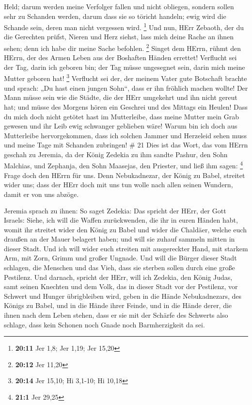 Held; darum werden meine Verfolger fallen und nicht obliegen, sondern
sollen sehr zu Schanden werden, darum dass sie so töricht handeln; ewig
wird die Schande sein, deren man nicht vergessen wird. \footnote{\textbf{20:11}
  Jer 1,8; Jer 1,19; Jer 15,20}  Und nun, HErr Zebaoth, der
du die Gerechten prüfst, Nieren und Herz siehst, lass mich deine Rache
an ihnen sehen; denn ich habe dir meine Sache befohlen. \footnote{\textbf{20:12}
  Jer 11,20}  Singet dem HErrn, rühmt den HErrn, der des
Armen Leben aus der Boshaften Händen errettet!  Verflucht
sei der Tag, darin ich geboren bin; der Tag müsse ungesegnet sein, darin
mich meine Mutter geboren hat! \footnote{\textbf{20:14} Jer 15,10; Hi
  3,1-10; Hi 10,18}  Verflucht sei der, der meinem Vater
gute Botschaft brachte und sprach: „Du hast einen jungen Sohn``, dass er
ihn fröhlich machen wollte!  Der Mann müsse sein wie die
Städte, die der HErr umgekehrt und ihn nicht gereut hat; und müsse des
Morgens hören ein Geschrei und des Mittags ein Heulen! 
Dass du mich doch nicht getötet hast im Mutterleibe, dass meine Mutter
mein Grab gewesen und ihr Leib ewig schwanger geblieben wäre!
 Warum bin ich doch aus Mutterleibe hervorgekommen, dass
ich solchen Jammer und Herzeleid sehen muss und meine Tage mit Schanden
zubringen! \# 21  Dies ist das Wort, das vom HErrn geschah
zu Jeremia, da der König Zedekia zu ihm sandte Pashur, den Sohn
Malchias, und Zephanja, den Sohn Maasejas, den Priester, und ließ ihm
sagen: \footnote{\textbf{21:1} Jer 29,25}  Frage doch den
HErrn für uns. Denn Nebukadnezar, der König zu Babel, streitet wider
uns; dass der HErr doch mit uns tun wolle nach allen seinen Wundern,
damit er von uns abzöge.

 Jeremia sprach zu ihnen: So saget Zedekia:  Das
spricht der HErr, der Gott Israels: Siehe, ich will die Waffen
zurückwenden, die ihr in euren Händen habt, womit ihr streitet wider den
König zu Babel und wider die Chaldäer, welche euch draußen an der Mauer
belagert haben; und will sie zuhauf sammeln mitten in dieser Stadt.
 Und ich will wider euch streiten mit ausgereckter Hand, mit
starkem Arm, mit Zorn, Grimm und großer Ungnade.  Und will
die Bürger dieser Stadt schlagen, die Menschen und das Vieh, dass sie
sterben sollen durch eine große Pestilenz.  Und darnach,
spricht der HErr, will ich Zedekia, den König Judas, samt seinen
Knechten und dem Volk, das in dieser Stadt vor der Pestilenz, vor
Schwert und Hunger übrigbleiben wird, geben in die Hände Nebukadnezars,
des Königs zu Babel, und in die Hände ihrer Feinde, und in die Hände
derer, die ihnen nach dem Leben stehen, dass er sie mit der Schärfe des
Schwerts also schlage, dass kein Schonen noch Gnade noch Barmherzigkeit
da sei.

